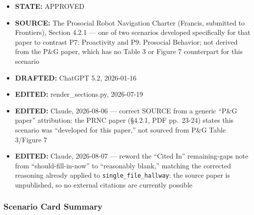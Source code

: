 \documentclass[utf8]{frontiers_suppmat} %
\providecommand{\tightlist}{%
  \setlength{\itemsep}{0pt}\setlength{\parskip}{0pt}}
\begin{document}
\begin{itemize}
\tightlist
\item
  \textbf{STATE:} APPROVED
\item
  \textbf{SOURCE:} The Prosocial Robot Navigation Charter (Francis,
  submitted to Frontiers), Section 4.2.1 --- one of two scenarios
  developed specifically for that paper to contrast P7: Proactivity and
  P9: Prosocial Behavior; not derived from the P\&G paper, which has no
  Table 3 or Figure 7 counterpart for this scenario
\item
  \textbf{DRAFTED:} ChatGPT 5.2, 2026-01-16
\item
  \textbf{EDITED:} render\_sections.py, 2026-07-19
\item
  \textbf{EDITED:} Claude, 2026-08-06 --- correct SOURCE from a generic
  ``P\&G paper'' attribution: the PRNC paper (§4.2.1, PDF pp.~23-24)
  states this scenario was ``developed for this paper,'' not sourced
  from P\&G Table 3/Figure 7
\item
  \textbf{EDITED:} Claude, 2026-08-07 --- reword the ``Cited In''
  remaining-gaps note from ``should-fill-in-now'' to ``reasonably
  blank,'' matching the corrected reasoning already applied to
  \texttt{single\_file\_hallway}: the source paper is unpublished, so no
  external citations are currently possible
\end{itemize}

\subsubsection{Scenario Card Summary}\label{scenario-card-summary}
\end{document}
